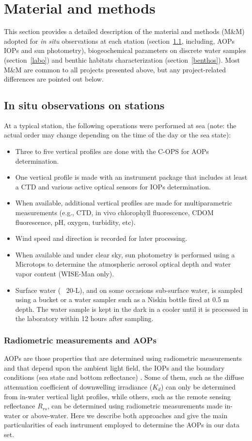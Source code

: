 \documentclass[essd, manuscript]{copernicus}
\begin{document}
\section{Material and methods}
This section provides a detailed description of the material and methods (M\&M) adopted for \textit{in situ} observations at each station (section~\ref{insitu}, including, AOPs IOPs and sun photometry), biogeochemical parameters on discrete water samples (section~\ref{labo}) and benthic habitats characterization (section~\ref{benthos}). Most M\&M are common to all projects presented above, but any project-related differences are pointed out below. 

\subsection{In situ observations on stations} \label{insitu}
At a typical station, the following operations were performed at sea (note: the actual order may change depending on the time of the day or the sea state):
\begin{itemize}
  \item Three to five vertical profiles are done with the C-OPS for AOPs  determination.
  \item One vertical profile is made with an instrument package that includes at least a CTD and various active optical sensors for IOPs determination.
  \item When available, additional vertical profiles are made for multiparametric measurements (e.g., CTD, in vivo chlorophyll fluorescence, CDOM fluorescence, pH, oxygen, turbidity, etc).
  \item Wind speed and direction is recorded for later processing. 
  \item When available and under clear sky, sun photometry is performed using a Microtops to determine the atmospheric aerosol optical depth and water vapor content (WISE-Man only).
  \item Surface water (~ 20-L), and on some occasions sub-surface water, is sampled using a bucket or a water sampler such as a Niskin bottle fired at 0.5 m depth. The water sample is kept in the dark in a cooler until it is processed in the laboratory within 12 hours after sampling.
\end{itemize}

\subsubsection{Radiometric measurements and AOPs}
AOPs are those properties that are determined using radiometric measurements and that depend upon the ambient light field, the IOPs and the boundary conditions (sea state and bottom reflectance) \citep{Preisendorfer1961}.  Some of them, such as the diffuse attenuation coefficient of downwelling irradiance ($K_d$) can only be determined from in-water vertical light profiles, while others, such as the remote sensing reflectance $R_{rs}$, can be determined using radiometric measurements made in-water or above-water.  Here we describe both approaches and give the main particularities of each instrument employed to determine the AOPs in our data set.  
\end{document}
